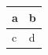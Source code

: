 \documentclass{article}
\begin{document}
\begin{tabular}{|p{2cm}|l|}\hline
a \arrayrulecolor{red} & b\\\hline
\multicolumn{1}{|p{2cm}|}{c \arrayrulecolor{blue}} & d\\
\end{tabular}
\end{document}
